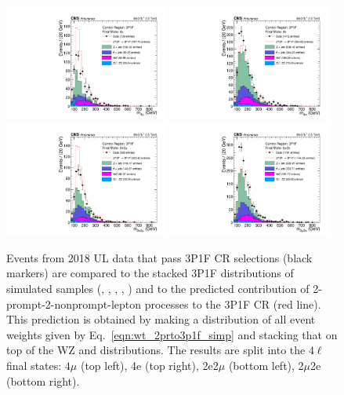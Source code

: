 \begin{figure}[!htbp]
	\begin{center}
		\includegraphics[width=0.48\textwidth]{figures/higgsmassmeas/redbkg/cr/UL2018_CR_3P1F_4mu.pdf}
		\includegraphics[width=0.48\textwidth]{figures/higgsmassmeas/redbkg/cr/UL2018_CR_3P1F_4e.pdf}
		\includegraphics[width=0.48\textwidth]{figures/higgsmassmeas/redbkg/cr/UL2018_CR_3P1F_2e2mu.pdf}
		\includegraphics[width=0.48\textwidth]{figures/higgsmassmeas/redbkg/cr/UL2018_CR_3P1F_2mu2e.pdf}
		\caption{
			Events from 2018 UL data that pass 3P1F CR selections (black markers) 
			are compared to the stacked 3P1F distributions of simulated samples
			(\Zplusjets, \ttbarplusjets, \WZ, \Zgammastar, \ZZ)
			and to the predicted contribution of 2-prompt-2-nonprompt-lepton processes to the 3P1F CR (red line).
			This prediction is obtained by making a distribution of all event weights given by Eq.~\ref{eqn:wt_2prto3p1f_simp} and stacking that on top of the WZ and \ZZ distributions.
			The results are split into the $4\ell$ final states:
			$4\mu$ (top left), 4e (top right), 2e2$\mu$ (bottom left), 2$\mu$2e (bottom right).
		}
		\label{cr_plots_3p1f_2018}
	\end{center}
\end{figure}

